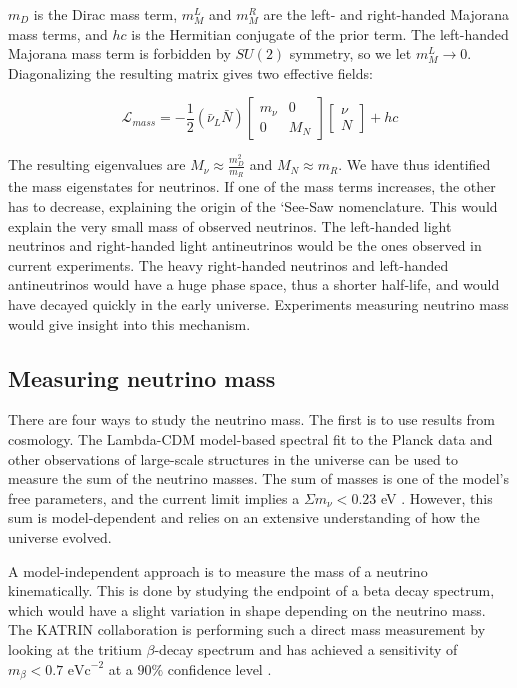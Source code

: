 $m_D$ is the Dirac mass term, $m_M^L$ and $m_M^R$ are the left- and right-handed Majorana mass terms, and $hc$ is the Hermitian conjugate of the prior term. The left-handed Majorana mass term is forbidden by $SU (2)$ symmetry, so we let $m_M^L \rightarrow 0$. Diagonalizing the resulting matrix gives two effective fields: 

\begin{equation}\label{mass_lagrangian_reduced}
\mathcal{L}_{mass} = -\frac{1}{2}(\bar{\nu}_L\bar{N}) \begin{bmatrix} m_\nu & 0 \\ 0 & M_N \end{bmatrix} \begin{bmatrix} \nu \\ N \end{bmatrix} + hc
\end{equation}

The resulting eigenvalues are $M_\nu \approx \frac{m^2_D}{m_R}$ and $M_N \approx m_R$. We have thus identified the mass eigenstates for neutrinos. If one of the mass terms increases, the other has to decrease, explaining the origin of the `See-Saw nomenclature. This would explain the very small mass of observed neutrinos. The left-handed light neutrinos and right-handed light antineutrinos would be the ones observed in current experiments. The heavy right-handed neutrinos and left-handed antineutrinos would have a huge phase space, thus a shorter half-life, and would have decayed quickly in the early universe. Experiments measuring neutrino mass would give insight into this mechanism. 

\subsection{Measuring neutrino mass}

There are four ways to study the neutrino mass. The first is to use results from cosmology. The Lambda-CDM model-based spectral fit to the Planck data and other observations of large-scale structures in the universe can be used to measure the sum of the neutrino masses. The sum of masses is one of the model's free parameters, and the current limit implies a $\Sigma m_\nu<0.23$ eV \cite{Planck_2015fie}. However, this sum is model-dependent and relies on an extensive understanding of how the universe evolved. 

A model-independent approach is to measure the mass of a neutrino kinematically. This is done by studying the endpoint of a beta decay spectrum, which would have a slight variation in shape depending on the neutrino mass. The KATRIN collaboration is performing such a direct mass measurement by looking at the tritium $\beta$-decay spectrum and has achieved a sensitivity of $m_\beta < 0.7 \text{ eVc}^{-2}$ at a $90\%$ confidence level \cite{KATRIN:2022}.

